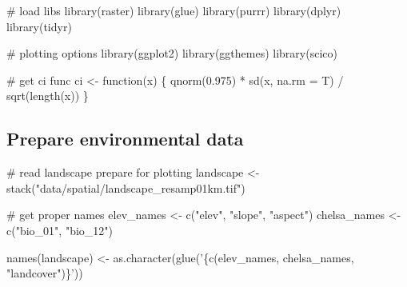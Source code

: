 \documentclass[]{article}
\newenvironment{Shaded}{}{}
\newcommand{\CommentTok}[1]{\textcolor[rgb]{0.00,0.50,0.00}{#1}}
\newcommand{\ControlFlowTok}[1]{\textcolor[rgb]{0.00,0.00,1.00}{#1}}
\newcommand{\DataTypeTok}[1]{#1}
\newcommand{\FloatTok}[1]{#1}
\newcommand{\KeywordTok}[1]{\textcolor[rgb]{0.00,0.00,1.00}{#1}}
\newcommand{\NormalTok}[1]{#1}
\newcommand{\OperatorTok}[1]{#1}
\newcommand{\StringTok}[1]{\textcolor[rgb]{0.00,0.50,0.50}{#1}}
\begin{document}
\begin{Shaded}
\begin{Highlighting}[numbers=left,,]
\CommentTok{# load libs}
\KeywordTok{library}\NormalTok{(raster)}
\KeywordTok{library}\NormalTok{(glue)}
\KeywordTok{library}\NormalTok{(purrr)}
\KeywordTok{library}\NormalTok{(dplyr)}
\KeywordTok{library}\NormalTok{(tidyr)}

\CommentTok{# plotting options}
\KeywordTok{library}\NormalTok{(ggplot2)}
\KeywordTok{library}\NormalTok{(ggthemes)}
\KeywordTok{library}\NormalTok{(scico)}

\CommentTok{# get ci func}
\NormalTok{ci <-}\StringTok{ }\ControlFlowTok{function}\NormalTok{(x) \{}
  \KeywordTok{qnorm}\NormalTok{(}\FloatTok{0.975}\NormalTok{) }\OperatorTok{*}\StringTok{ }\KeywordTok{sd}\NormalTok{(x, }\DataTypeTok{na.rm =}\NormalTok{ T) }\OperatorTok{/}\StringTok{ }\KeywordTok{sqrt}\NormalTok{(}\KeywordTok{length}\NormalTok{(x))}
\NormalTok{\}}
\end{Highlighting}
\end{Shaded}

\hypertarget{prepare-environmental-data}{%
\subsection{Prepare environmental data}\label{prepare-environmental-data}}

\begin{Shaded}
\begin{Highlighting}[numbers=left,,]
\CommentTok{# read landscape prepare for plotting}
\NormalTok{landscape <-}\StringTok{ }\KeywordTok{stack}\NormalTok{(}\StringTok{"data/spatial/landscape_resamp01km.tif"}\NormalTok{)}

\CommentTok{# get proper names}
\NormalTok{elev_names <-}\StringTok{ }\KeywordTok{c}\NormalTok{(}\StringTok{"elev"}\NormalTok{, }\StringTok{"slope"}\NormalTok{, }\StringTok{"aspect"}\NormalTok{)}
\NormalTok{chelsa_names <-}\StringTok{ }\KeywordTok{c}\NormalTok{(}\StringTok{"bio_01"}\NormalTok{, }\StringTok{"bio_12"}\NormalTok{)}

\KeywordTok{names}\NormalTok{(landscape) <-}\StringTok{ }\KeywordTok{as.character}\NormalTok{(}\KeywordTok{glue}\NormalTok{(}\StringTok{'\{c(elev_names, chelsa_names, "landcover")\}'}\NormalTok{))}
\end{Highlighting}
\end{Shaded}
\end{document}
